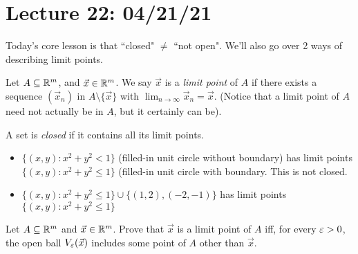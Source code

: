 \section{Lecture 22: 04/21/21}

Today's core lesson is that ``closed" $\neq$ ``not open". We'll also go over 2 ways of describing limit points.

\begin{definition}
Let $A \subseteq \mathbb{R}^m$, and $\vec x \in \mathbb{R}^m$. We say $\vec x $ is a \textit{limit point} of $A$ if there exists a sequence $(\vec x_n)$ in $A \setminus \{\vec x\}$ with $\lim_{n \to \infty} \vec x_n = \vec x$. (Notice that a limit point of $A$ need not actually be in $A$, but it certainly can be).
\end{definition}

\begin{definition}
A set is \textit{closed} if it contains all its limit points.
\end{definition}

\begin{example}\quad
\begin{itemize}
    \item $\{(x,y) : x^2 + y^2 < 1\}$ (filled-in unit circle without boundary) has limit points $\{(x,y) : x^2 + y^2 \le 1\}$ (filled-in unit circle with boundary. This is not closed.
    \item $\{(x,y) : x^2 + y^2 \le 1\} \cup \{(1, 2), (-2, -1)\}$ has limit points $\{(x,y) : x^2 + y^2 \le 1\}$
\end{itemize}
\end{example}

\begin{theorem}
Let $A \subseteq \mathbb{R}^m$ and $\vec x \in \mathbb{R}^m$. Prove that $\vec x$ is a limit point of $A$ iff, for every $\varepsilon > 0$, the open ball $V_\varepsilon(\vec x)$ includes some point of $A$ other than $\vec x$.
\end{theorem}


